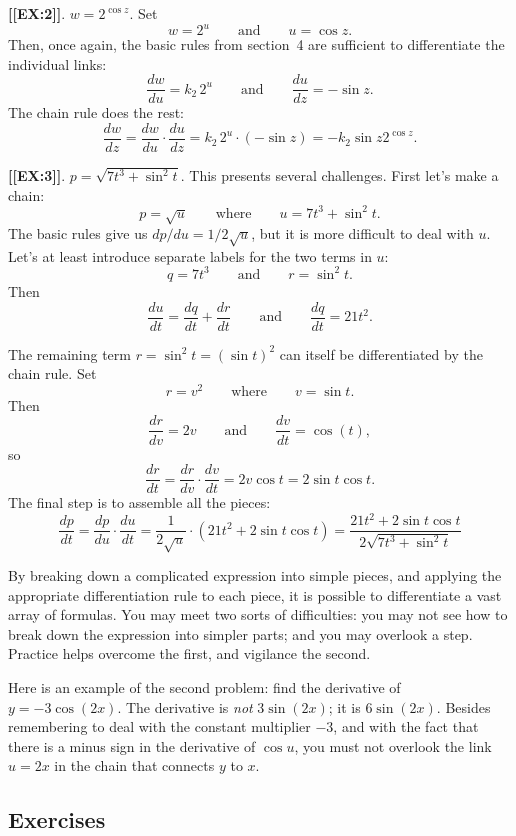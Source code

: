 {\bf [[EX:2]]}.  $w = 2^{\cos{z}}$.  Set
	\[
w = 2^u \qquad \mbox{and} \qquad u = \cos{z}.
\]
Then, once again, the basic rules from section~4 are sufficient to differentiate the individual links:
	\[
\dfrac{dw}{du} =  k_2 \, 2^u \qquad \mbox{and} \qquad
		\dfrac{du}{dz} = - \sin{z}.
\]
The chain rule does the rest:
	\[
\dfrac{dw}{dz} = \dfrac{dw}{du} \cdot \dfrac{du}{dz} = 
		k_2 \, 2^u \cdot (-\sin{z}) = 
		- k_2 \sin{z} 2^{\cos{z}}.
\]




{\bf [[EX:3]]}.  $p = \sqrt{7t^3 + \sin^2{t}}$.  This presents several challenges.  First let's make a chain:
	\[
p = \sqrt{u} \qquad \mbox{where} \qquad 
		u = 7t^3 + \sin^2{t}.
\]
The basic rules give us $dp/du = 1/2\sqrt{u}$, but it is more difficult to deal with $u$.  Let's at least introduce separate labels for the two terms in $u$:
	\[
q = 7t^3 \qquad \mbox{and} \qquad r = \sin^2{t}.
\]
Then 
	\[
\dfrac{du}{dt} = \dfrac{dq}{dt} + \dfrac{dr}{dt} \qquad 
		\mbox{and} \qquad \dfrac{dq}{dt} = 21 t^2.
\]

The remaining term $r = \sin^2{t} = (\sin{t})^2$ can itself be
differentiated by the chain rule.  Set
	\[
r = v^2 \qquad \mbox{where} \qquad v = \sin{t}.
\]
Then 
	\[
\dfrac{dr}{dv} = 2v \qquad \mbox{and}  \qquad
		 \dfrac{dv}{dt} = \cos(t),
\]
so
	\[
\dfrac{dr}{dt} = \dfrac{dr}{dv} \cdot \dfrac{dv}{dt} = 
		2v \cos{t} = 2 \sin{t} \cos{t}.
\]
The final step is to assemble all the pieces:
	\[
\dfrac{dp}{dt} = \dfrac{dp}{du} \cdot \dfrac{du}{dt} =
		\dfrac{1}{2\sqrt{u}} \cdot 
			\left(21 t^2 + 2 \sin{t} \cos{t}\right) =
		\dfrac{21 t^2 + 2 \sin{t} \cos{t}} 
			{2\sqrt{7t^3 + \sin^2{t}}}
\]


By breaking down a complicated expression into simple pieces, and
applying the appropriate differentiation rule to each piece, it is
possible to differentiate a vast array of formulas.  You may meet two
sorts of difficulties: you may not see how to break down the
expression into simpler parts; and you may overlook a step.  Practice
helps overcome the first, and vigilance the second.

Here is an example of the second problem: find the derivative of $y =
-3 \cos(2x)$.  The derivative is {\em not\/} $3 \sin(2x)$; it is
$6\sin(2x)$.  Besides remembering to deal with the constant multiplier
$-3$, and with the fact that there is a minus sign in the derivative
of $\cos{u}$, you must not overlook the link $u = 2x$ in the chain
that connects $y$ to $x$.

\subsection{Exercises}
\label{subsec:exercises}


